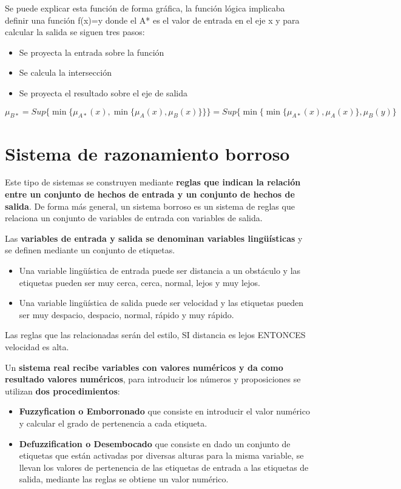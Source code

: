 \documentclass[12pt, twoside, openright]{report} %
\begin{document}
Se puede explicar esta función de forma gráfica, la función lógica implicaba definir una función f(x)=y donde el A* es el valor de entrada en el eje x y para calcular la salida se siguen tres pasos:
\begin{itemize}
	\item Se proyecta la entrada sobre la función
	\item Se calcula la intersección
	\item Se proyecta el resultado sobre el eje de salida
\end{itemize}

$$\mu_{B*}=Sup\{\min \{\mu_{A*}(x),\min \{\mu_{A}(x), \mu_{B}(x)\}\}\}=Sup\{\min \{\min \{\mu_{A*}(x), \mu_{A}(x)\},\mu_B(y)\}$$

\section{Sistema de razonamiento borroso}
Este tipo de sistemas se construyen mediante \textbf{reglas que indican la relación entre un conjunto de hechos de entrada y un conjunto de hechos de salida}. De forma más general, un sistema borroso es un sistema de reglas que relaciona un conjunto de variables de entrada con variables de salida. 

Las \textbf{variables de entrada y salida se denominan variables lingüísticas} y se definen mediante un conjunto de etiquetas. 
\begin{itemize}
	\item Una variable lingüística de entrada puede ser distancia a un obstáculo y las etiquetas pueden ser muy cerca, cerca, normal, lejos y muy lejos. 
	\item Una variable lingüística de salida puede ser velocidad y las etiquetas pueden ser muy despacio, despacio, normal, rápido y muy rápido.
\end{itemize}  

Las reglas que las relacionadas serán del estilo, SI distancia es lejos ENTONCES velocidad es alta.

Un \textbf{sistema real recibe variables con valores numéricos y da como resultado valores numéricos}, para introducir los números y proposiciones se utilizan \textbf{dos procedimientos}: 
\begin{itemize}
	\item \textbf{Fuzzyfication o Emborronado} que consiste en introducir el valor numérico y calcular el grado de pertenencia a cada etiqueta.
	\item \textbf{Defuzzification o Desembocado} que consiste en dado un conjunto de etiquetas que están activadas por diversas alturas para la misma variable, se llevan los valores de pertenencia de las etiquetas de entrada a las etiquetas de salida, mediante las reglas  se obtiene un valor numérico.
\end{itemize}
\end{document}
